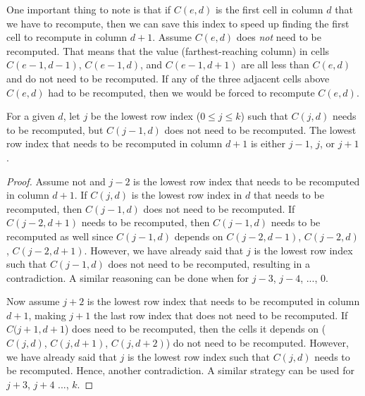 One important thing to note is that if $C(e,d)$ is the first cell in column $d$ that we have to recompute, then we can save this index to speed up finding the first cell to recompute in column $d+1$.
Assume $C(e,d)$ does \emph{not} need to be recomputed.
That means that the value (farthest-reaching column) in cells $C(e-1,d-1)$, $C(e-1,d)$, and $C(e-1,d+1)$ are all less than $C(e,d)$ and do not need to be recomputed.
If any of the three adjacent cells above $C(e,d)$ had to be recomputed, then we would be forced to recompute $C(e,d)$.

\begin{theorem}
For a given $d$, let $j$ be the lowest row index ($0 \leq j \leq k$) such that $C(j,d)$ needs to be recomputed, but $C(j-1,d)$ does not need to be recomputed. The lowest row index that needs to be recomputed in column $d+1$ is either $j-1$, $j$, or $j+1$.
\end{theorem}

\begin{proof}
Assume not and $j-2$ is the lowest row index that needs to be recomputed in column $d+1$.  If $C(j,d)$ is the lowest row index in $d$ that needs to be recomputed, then $C(j-1,d)$ does not need to be recomputed.  If $C(j-2,d+1)$ needs to be recomputed, then $C(j-1,d)$ needs to be recomputed as well since $C(j-1,d)$ depends on $C(j-2,d-1)$, $C(j-2,d)$, $C(j-2,d+1)$.  However, we have already said that $j$ is the lowest row index such that $C(j-1,d)$ does not need to be recomputed, resulting in a contradiction.  A similar reasoning can be done when for $j-3$, $j-4$, ..., 0.

Now assume $j+2$ is the lowest row index that needs to be recomputed in column $d+1$, making $j+1$ the last row index that does not need to be recomputed.  If $C(j+1,d+1$) does need to be recomputed, then the cells it depends on ($C(j,d)$, $C(j,d+1)$, $C(j,d+2)$) do not need to be recomputed.  However, we have already said that $j$ is the lowest row index such that $C(j,d)$ needs to be recomputed.  Hence, another contradiction.  A similar strategy can be used for $j+3$, $j+4$ ..., $k$.


\end{proof}

